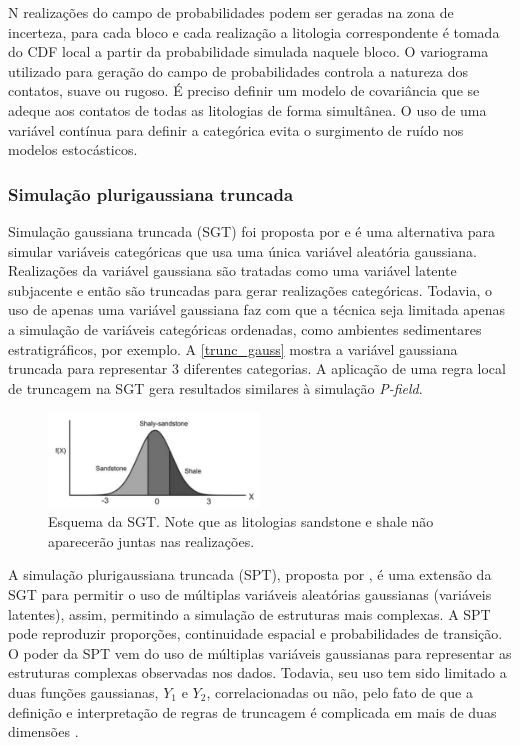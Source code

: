 N realizações do campo de probabilidades podem ser geradas na zona de incerteza, para cada bloco e cada realização a litologia correspondente é tomada do CDF local a partir da probabilidade simulada naquele bloco. O variograma utilizado para geração do campo de probabilidades controla a natureza dos contatos, suave ou rugoso. É preciso definir um modelo de covariância que se adeque aos contatos de todas as litologias de forma simultânea. O uso de uma variável contínua para definir a categórica evita o surgimento de ruído nos modelos estocásticos.	

\subsubsection{Simulação plurigaussiana truncada}

Simulação gaussiana truncada (SGT) foi proposta por  e é uma alternativa para simular variáveis categóricas que usa uma única variável aleatória gaussiana. Realizações da variável gaussiana são tratadas como uma variável latente subjacente \cite{hier_plurigauss} e então são truncadas para gerar realizações categóricas. Todavia, o uso de apenas uma variável gaussiana faz com que a técnica seja limitada apenas a simulação de variáveis categóricas ordenadas, como ambientes sedimentares estratigráficos, por exemplo. A \autoref{trunc_gauss} mostra a variável gaussiana truncada para representar 3 diferentes categorias. A aplicação de uma regra local de truncagem na SGT gera resultados similares à simulação \textit{P-field}.

\begin{figure}[!ht]
	\caption{\label{trunc_gauss}Esquema da SGT. Note que as litologias sandstone e shale não aparecerão juntas nas realizações.}
	\begin{center}
		\includegraphics[width=0.5\textwidth]{capitulo_3/gauss_trunc_sketch.png}
	\end{center}
\end{figure}

A simulação plurigaussiana truncada (SPT), proposta por , é uma extensão da SGT para permitir o uso de múltiplas variáveis aleatórias gaussianas (variáveis latentes), assim, permitindo a simulação de estruturas mais complexas. A SPT pode reproduzir proporções, continuidade espacial e probabilidades de transição. O poder da SPT vem do uso de múltiplas variáveis gaussianas para representar as estruturas complexas observadas nos dados. Todavia, seu uso tem sido limitado a duas funções gaussianas, $Y_1$ e $Y_2$, correlacionadas ou não, pelo fato de que a definição e interpretação de regras de truncagem é complicada em mais de duas dimensões \cite{hier_plurigauss}.

